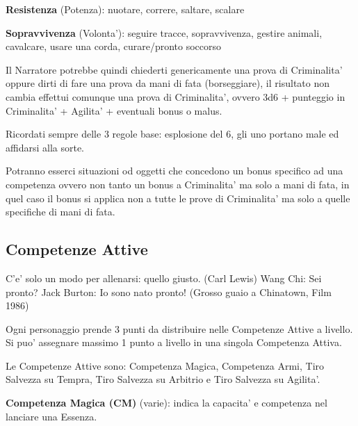 \documentclass[a4paper,11pt,twoside,openany]{dndbook}
\begin{document}
\textbf{Resistenza} (Potenza): nuotare, correre, saltare, scalare

\textbf{Sopravvivenza} (Volonta'): seguire tracce, sopravvivenza, gestire animali, cavalcare, usare una corda, curare/pronto soccorso

\bigskip

Il Narratore potrebbe quindi chiederti genericamente una prova di
Criminalita' oppure dirti di fare una prova da mani di fata (borseggiare),
il risultato non cambia effettui comunque una prova di Criminalita',
ovvero 3d6 + punteggio in Criminalita' + Agilita' + eventuali bonus
o malus.

Ricordati sempre delle 3 regole base: esplosione del 6, gli uno portano
male ed affidarsi alla sorte.

\bigskip

Potranno esserci situazioni od oggetti che concedono un bonus specifico ad una competenza ovvero non tanto un bonus a Criminalita' ma solo a mani di fata, in quel caso il bonus si applica non a tutte le prove di Criminalita' ma solo a quelle specifiche di mani di fata.


\subsection{Competenze Attive}

\label{competenze-attive}
\begin{quotebox}C'e' solo un modo per allenarsi: quello giusto. (Carl Lewis)\linebreak\linebreak
Wang Chi: Sei pronto?\linebreak
Jack Burton: Io sono nato pronto! (Grosso guaio a Chinatown, Film 1986)
\end{quotebox}

Ogni personaggio prende 3 punti da distribuire nelle Competenze Attive a livello. Si puo' assegnare massimo 1 punto a livello in una singola Competenza Attiva.

Le Competenze Attive sono: Competenza Magica, Competenza Armi, Tiro Salvezza su Tempra, Tiro Salvezza su Arbitrio e Tiro Salvezza su Agilita'.

\textbf{Competenza Magica (CM)} (varie): indica la capacita' e competenza nel lanciare una Essenza.
\end{document}
